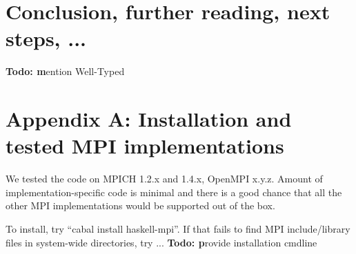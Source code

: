 \documentclass{tmr}
\newcommand{\Todo}[1]{{\textbf{Todo: #1}}}
\begin{document}
\section{Conclusion, further reading, next steps, ...}

\Todo mention Well-Typed

\section{Appendix A: Installation and tested MPI implementations}
\label{appendix-A}
We tested the code on MPICH 1.2.x and 1.4.x, OpenMPI x.y.z. Amount of implementation-specific code is minimal and there is a good chance that all the other MPI implementations would be supported out of the box.

To install, try ``cabal install haskell-mpi''. If that fails to find MPI include/library files in system-wide directories, try ...
\Todo provide installation cmdline


\end{document}
